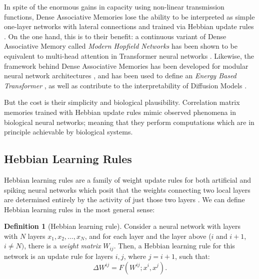 \documentclass{article}
\theoremstyle{definition}
\newtheorem{definition}{Definition}[subsection]
\begin{document}
In spite of the enormous gains in capacity using non-linear
transmission functions, Dense Associative Memories lose the ability
to be interpreted as simple one-layer networks with lateral connections
and trained via Hebbian update rules
\parencites{krotov_large_2021,mcalister_sequential_2025}.
On the one hand, this is to their benefit: a continuous variant of
Dense Associative
Memory called \textit{Modern Hopfield Networks} has been shown to be
equivalent to multi-head attention in Transformer neural networks
\parencites{ramsauer_hopfield_2021,vaswani_attention_2023}. Likewise,
the framework behind Dense Associative Memories has been developed for
modular neural network architectures \parencite{krotov_hierarchical_2021},
and has been used to define an \textit{Energy Based Transformer}
\parencite{hoover_energy_2023}, as well as contribute to the interpretability
of Diffusion Models \parencite{pham_memorization_2025}.

But the cost is their simplicity and biological plausibility.
Correlation matrix memories
trained with Hebbian update rules mimic observed phenomena in
biological neural networks; meaning that they perform computations
which are in principle achievable by biological systems.

\subsection{Hebbian Learning Rules}\label{sec:hebbian-learning-rules}

Hebbian learning rules are a family of weight update rules for both
artificial and spiking neural networks which posit that
the weights connecting two local layers are determined entirely
by the activity of just those two layers
\parencites{hebb_organization_1949,sejnowski_hebb_1989}.
We can define Hebbian learning rules in the most general sense:
\begin{definition}[Hebbian learning rule]\label{def:hebbian-learning-rule}
  Consider a neural network with layers with $N$ layers $x_{1}, x_2,
  \dots, x_N$,
  and for each layer and the layer above ($i$ and $i + 1$, $i \neq N)$, there
  is a \textit{weight matrix} $W_{ij}$. Then, a Hebbian learning rule for this
  network is an update rule for layers $i, j$, where $j = i + 1$, such that:
  \begin{equation}
    \Delta W^{ij} = F(W^{ij}; x^i, x^j).
  \end{equation}
\end{definition}
\end{document}
